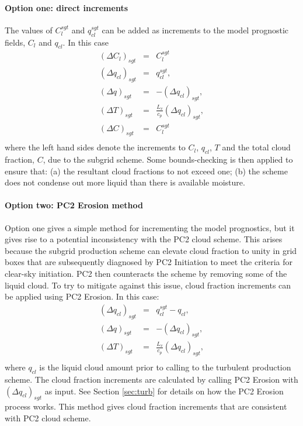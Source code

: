 \documentclass{UMDP_article}
\begin{document}
\paragraph{Option one:  direct increments}

The values of  $C_l^{sgt}$ and $q_{cl}^{sgt}$ can be added as increments to the
model prognostic fields, $C_l$ and $q_{cl}$. In this case
\begin{eqnarray}
 \left( \Delta C_l \right)_{sgt} &=&  C_l^{sgt} \\ 
 \left( \Delta q_{cl} \right)_{sgt} &=& q_{cl}^{sgt}, \\
 \left( \Delta q \right)_{sgt} &=& -\left( \Delta q_{cl} \right)_{sgt}, \\
 \left( \Delta T \right)_{sgt} &=& \frac{L_v}{c_p} \left( \Delta q_{cl} \right)_{sgt}, \\
 \left( \Delta C \right)_{sgt} &=&  C_l^{sgt} \\
\end{eqnarray}
where the left hand sides denote the increments to $C_l$, $q_{cl}$, $T$ and the
total cloud fraction, $C$, due to
the subgrid scheme. Some bounds-checking is then applied to ensure that:
(a) the resultant cloud fractions to not exceed one; (b) the scheme does not
condense out more liquid than there is available moisture.

\paragraph{Option two:  PC2 Erosion method}

Option one gives a simple method for incrementing the model prognostics, but
it gives rise to a potential inconsistency with the PC2 cloud scheme. This arises because
the subgrid production scheme can elevate cloud fraction to unity in grid boxes
that are subsequently diagnosed by PC2 Initiation to meet the criteria for clear-sky initiation.
PC2 then counteracts the scheme by removing some of the liquid cloud. To try to mitigate
against this issue, cloud fraction increments can be applied using PC2 Erosion. In this case:
\begin{eqnarray}
 \left( \Delta q_{cl} \right)_{sgt} &=& q_{cl}^{sgt} - q_{cl}, \\
 \left( \Delta q \right)_{sgt} &=& -\left( \Delta q_{cl} \right)_{sgt}, \\
 \left( \Delta T \right)_{sgt} &=& \frac{L_v}{c_p} \left( \Delta q_{cl} \right)_{sgt}, \\
\end{eqnarray}
where $q_{cl}$ is the liquid cloud amount prior to calling to the
turbulent production scheme. The cloud fraction increments are calculated
by calling PC2 Erosion with $\left( \Delta q_{cl} \right)_{sgt}$ as input.
See Section \ref{sec:turb} for details on how the PC2 Erosion process works.
This method gives cloud fraction increments that are consistent with
PC2 cloud scheme.
\end{document}
